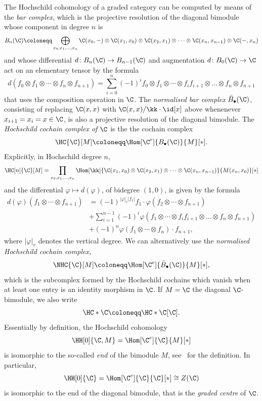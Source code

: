 \documentclass[a4paper]{amsart}
\begin{document}
The Hochschild cohomology of a graded category can be computed by means of the
\emph{bar complex}, which is the projective resolution of the diagonal bimodule
whose component in degree $n$ is
\[
  B_n(\C)\coloneqq\bigoplus_{x_0,x_1,\dots,x_n}\C(x_0,-)\otimes\C(x_1,x_0)\otimes\C(x_2,x_1)\otimes\cdots\otimes\C(x_n,x_{n-1})\otimes\C(-,x_n)
\]
and whose differential $d\colon B_n(\C)\to B_{n-1}(\C)$ and augmentation
$d\colon B_0(\C)\to \C$ act on an elementary tensor by the formula
\[
  d(f_0\otimes f_1\otimes\cdots\otimes f_n\otimes
  f_{n+1})=\sum_{i=0}^n(-1)^if_0\otimes f_1\otimes\cdots\otimes
  f_{i}f_{i+1}\otimes\dots\otimes f_n\otimes f_{n+1}
\]
that uses the composition operation in $\C$. The \emph{normalised bar complex} $\bar{B}_\bullet(\C)$, consisting of replacing $\C(x,x)$ with $\C(x,x)/\kk\cdot\id[x]$ above whenenever $x_{i+1}=x_i=x\in\C$, is also a projective resolution of the diagonal bimodule.
The \emph{Hochschild cochain
  complex of $\C$} is the the cochain complex
\[
  \HC{\C}[M]\coloneqq\Hom[\C^e]{B_\bullet(\C)}{M}[*].
\]
Explicitly, in Hochschild degree $n$,
\[
  \HC[n]{\C}[M]=\prod_{x_0,x_1,\dots,x_n}\Hom[\kk]{\C(x_1,x_0)\otimes\C(x_2,x_1)\otimes\cdots\otimes\C(x_n,x_{n-1})}{M(x_n,x_0)}[*]
\]
and the differential $\varphi\mapsto d(\varphi)$, of bidegree $(1,0)$, is given
by the formula
\begin{align*}
  d(\varphi)(f_1\otimes\cdots\otimes f_{n+1}) &
                                                =(-1)^{|\varphi|_v|f_1|}f_1\cdot\varphi(f_2\otimes\cdots\otimes f_{n+1}) \\  &
                                                                                                                             +\sum_{i=1}^{n-1}(-1)^i\varphi(f_1\otimes\cdots\otimes
                                                                                                                             f_{i}f_{i+1}\otimes\dots\otimes f_n\otimes f_{n+1})                    \\  &
                                                                                                                                                                                                          +(-1)^{n}\varphi(f_1\otimes\cdots\otimes f_n)\cdot f_{n+1},
\end{align*}
where $|\varphi|_v$ denotes the vertical degree. 
We can alternatively use the \emph{normalised Hochschild cochain complex,}
\[
  \NHC{\C}[M]\coloneqq\Hom[\C^e]{\bar{B}_\bullet(\C)}{M}[*],
\]
which is the subcomplex formed by the Hochschild cochains which vanish when at least one entry is an identity morphism in $\C$. 
If $M=\C$ the diagonal $\C$-bimodule, we
also write
\[
  \HC*{\C}\coloneqq\HC*{\C}[\C].
\]
Essentially by definition, the Hochschild cohomology
\[
  \HH[0]{\C,M}=\Hom[\C^e]{\C}{M}[*]
\]
is isomorphic to the so-called \emph{end} of the bimodule $M$,
see~\cite[Sec.~2.1]{Kel05a} for the definition. In particular,
\[
  \HH[0]{\C}=\Hom[\C^e]{\C}{\C}[*]\cong Z(\C)
\]
is isomorphic to the end of the diagonal bimodule, that is the \emph{graded centre} of
$\C$.
\end{document}

